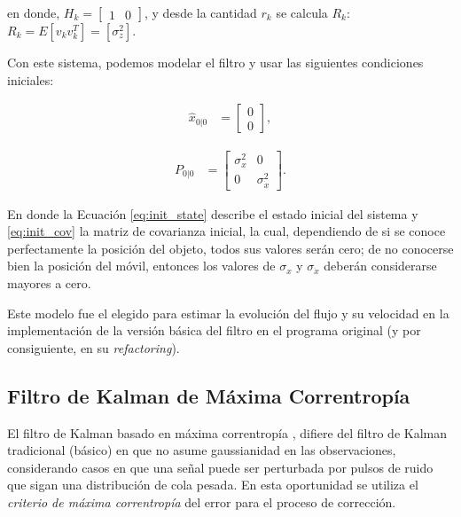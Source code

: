 en donde, $H_k = \begin{bmatrix}
1 & 0
\end{bmatrix}$, y desde la cantidad $r_k$ se calcula $R_k$: $R_k = E[v_kv_k^T]=[\sigma_{z}^2]$.

Con este sistema, podemos modelar el filtro y usar las siguientes condiciones iniciales:

\begin{align}
\hat{x}_{0|0} &= \begin{bmatrix}
0\\
0
\end{bmatrix},
\label{eq:init_state} 
\end{align} 

\begin{align}
P_{0|0} &= \begin{bmatrix}
\sigma_{x}^2 & 0\\
0 & \sigma_{\dot{x}}^2
\end{bmatrix}.
\label{eq:init_cov} 
\end{align} 

En donde la Ecuaci\'on \ref{eq:init_state} describe el estado inicial del sistema y \ref{eq:init_cov} la matriz de covarianza inicial, la cual, dependiendo de si se conoce perfectamente la posici\'on del objeto, todos sus valores ser\'an cero; de no conocerse bien la posici\'on del m\'ovil, entonces los valores de $\sigma_{x}$ y $\sigma_{\dot{x}}$ deber\'an considerarse mayores a cero.
\bigskip

Este modelo fue el elegido para estimar la evoluci\'on del flujo y su velocidad en la implementaci\'on de la versi\'on b\'asica del filtro en el programa original (y por consiguiente, en su \textit{refactoring}).



\subsection{Filtro de Kalman de M\'axima Correntrop\'ia}

El filtro de Kalman basado en m\'axima correntrop\'ia \cite{badong}, difiere del filtro de Kalman tradicional (b\'asico) en que no asume gaussianidad en las observaciones, considerando casos en que una se\~nal puede ser perturbada por pulsos de ruido que sigan una distribuci\'on de cola pesada. En esta oportunidad se utiliza el \textit{criterio de m\'axima correntrop\'ia} del error para el proceso de correcci\'on. 
\bigskip

